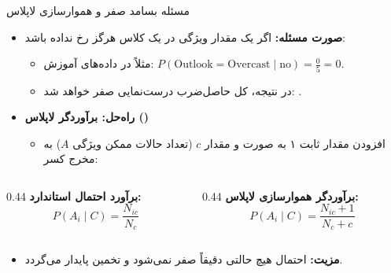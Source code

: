 \begin{frame}{مسئله بسامد صفر و هموارسازی لاپلاس}{}
  \begin{itemize}
    \setlength{\itemsep}{6pt}
    \item \textbf{صورت مسئله:} اگر یک مقدار ویژگی در یک کلاس هرگز رخ نداده باشد:
    \begin{itemize}
      \item مثلاً در داده‌های آموزش: $P(\text{Outlook}=\text{Overcast} \mid \text{no}) = \frac{0}{5} = 0$.
      \item در نتیجه، کل حاصل‌ضرب درست‌نمایی صفر خواهد شد: .
    \end{itemize}
    \item \textbf{راه‌حل: برآوردگر لاپلاس ()}
    \begin{itemize}
      \item افزودن مقدار ثابت ۱ به صورت و مقدار $c$ (تعداد حالات ممکن ویژگی $A$) به مخرج کسر:
    \end{itemize}
  \end{itemize}
  \vspace{0.2cm}
  \begin{columns}[T]
    \begin{column}{0.44\textwidth}
      \textbf{برآورد احتمال استاندارد:}
      \[
        P(A_i \mid C) = \frac{N_{ic}}{N_c}
      \]
    \end{column}
    \begin{column}{0.44\textwidth}
      \textbf{برآوردگر هموارسازی لاپلاس:}
      \[
        P(A_i \mid C) = \frac{N_{ic} + 1}{N_c + c}
      \]
    \end{column}
  \end{columns}
  \vspace{0.2cm}
  \begin{itemize}
    \item \textbf{مزیت:} احتمال هیچ حالتی دقیقاً صفر نمی‌شود و تخمین پایدار می‌گردد.
  \end{itemize}
\end{frame}

